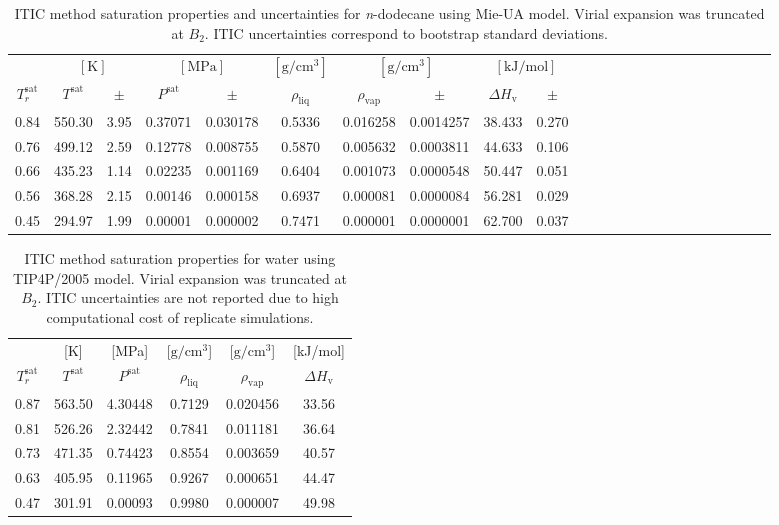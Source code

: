 \documentclass[5p,times]{elsarticle}
\begin{document}
\begin{table}[]
\centering
\caption{ITIC method saturation properties and uncertainties for \textit{n}-dodecane using Mie-UA model. Virial expansion was truncated at $B_2$. ITIC uncertainties correspond to bootstrap standard deviations.}
\label{tab:EXAMPLE-SIM/Mie-C12/}
\begin{tabular}{cccccccccccccccccccccccc}
 & \multicolumn{2}{c}{$[\mathrm{K}]$} &	 \multicolumn{2}{c}{$[\mathrm{MPa}]$}	& $[\mathrm{g/cm^3}]$ & \multicolumn{2}{c}{$[\mathrm{g/cm^3}]$} & \multicolumn{2}{c}{$[\mathrm{kJ/mol}]$} \\
$T_r^{\mathrm{sat}}$ & $T^{\mathrm{sat}}$ & $\pm$ & $P^{\mathrm{sat}}$ & $\pm$ & $\rho_{\mathrm{liq}}$ & $\rho_{\mathrm{vap}}$ & $\pm$ & $\Delta H_{\mathrm{v}}$ & $\pm$
 \\
\hline													
0.84	&	550.30	&	3.95	&	0.37071	&	0.030178	&	0.5336	&	0.016258	&	0.0014257	&	38.433	&	0.270	\\
0.76	&	499.12	&	2.59	&	0.12778	&	0.008755	&	0.5870	&	0.005632	&	0.0003811	&	44.633	&	0.106	\\
0.66	&	435.23	&	1.14	&	0.02235	&	0.001169	&	0.6404	&	0.001073	&	0.0000548	&	50.447	&	0.051	\\
0.56	&	368.28	&	2.15	&	0.00146	&	0.000158	&	0.6937	&	0.000081	&	0.0000084	&	56.281	&	0.029	\\
0.45	&	294.97	&	1.99	&	0.00001	&	0.000002	&	0.7471	&	0.000001	&	0.0000001	&	62.700	&	0.037	\\
\end{tabular}
\end{table}

\begin{table}[]
\centering
\caption{ITIC method saturation properties for water using TIP4P/2005 model. Virial expansion was truncated at $B_2$. ITIC uncertainties are not reported due to high computational cost of replicate simulations.}
\label{tab:EXAMPLE-SIM/TIP4P-water}
\begin{tabular}{cccccc}
 & {[}K{]} &	 {[}MPa{]} & {[}$\mathrm{g/cm^3}${]} & {[}$\mathrm{g/cm^3}${]}	& {[}kJ/mol{]}  \\
$T_r^{\mathrm{sat}}$ & $T^{\mathrm{sat}}$ & $P^{\mathrm{sat}}$ & $\rho_{\mathrm{liq}}$ & $\rho_{\mathrm{vap}}$ & $\Delta H_{\mathrm{v}}$ \\
\hline													
0.87	&	563.50	&	4.30448	&	0.7129	&	0.020456	&	33.56	\\
0.81	&	526.26	&	2.32442	&	0.7841	&	0.011181	&	36.64	\\
0.73	&	471.35	&	0.74423	&	0.8554	&	0.003659	&	40.57	\\
0.63	&	405.95	&	0.11965	&	0.9267	&	0.000651	&	44.47	\\
0.47	&	301.91	&	0.00093	&	0.9980	&	0.000007	&	49.98	\\
\end{tabular}
\end{table}
\end{document}
